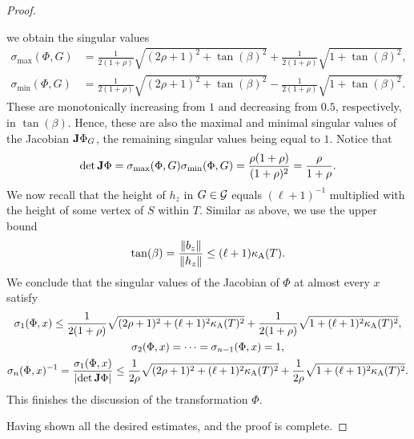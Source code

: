 \documentclass[10pt,a4paper]{article}
\begin{document}
\begin{proof}
\begin{itemize}
        we obtain the singular values 
        \begin{align*}
            \sigma_{\max}(\Phi,G) 
            &
            =
            \frac{1}{2(1+\rho)} \sqrt{ (2\rho + 1)^{2} + \tan(\beta)^2 } + \frac{1}{2(1+\rho)} \sqrt{ 1 + \tan(\beta)^2 } 
            ,
            \\
            \sigma_{\min}(\Phi,G) 
            &
            =
            \frac{1}{2(1+\rho)} \sqrt{ (2\rho + 1)^{2} + \tan(\beta)^2 } - \frac{1}{2(1+\rho)} \sqrt{ 1 + \tan(\beta)^2 } 
            .
        \end{align*}
        These are monotonically increasing from $1$ and decreasing from $0.5$, respectively, in $\tan(\beta)$. 
        Hence, these are also the maximal and minimal singular values of the Jacobian ${\mathbf{J}} \Phi_{G}$, the remaining singular values being equal to $1$. 
        Notice that 
        \begin{align*}
            \det {\mathbf{J}}\Phi = \sigma_{\max}(\Phi,G) \sigma_{\min}(\Phi,G) = \frac{\rho(1+\rho)}{(1+\rho)^2} = \frac{\rho}{1+\rho}.
        \end{align*}
        We now recall that the height of $h_{z}$ in $G \in {\mathcal G}$ equals $(\ell+1)^{-1}$ multiplied with the height of some vertex of $S$ within $T$.
        Similar as above, we use the upper bound 
        \begin{align*}
            \tan(\beta) = \frac{\|  b_{z}  \|}{\|  h_{z}  \|} \leq (\ell+1) \kappa_{\rm A}(T).
        \end{align*}
        We conclude that the singular values of the Jacobian of $\Phi$ at almost every $x$ satisfy 
        \begin{gather}
            \sigma_{1}(\Phi,x) %
            \leq 
            \frac{1}{2(1+\rho)} \sqrt{ (2\rho + 1)^{2} + (\ell+1)^2 \aspectratio(T)^2 } 
            + 
            \frac{1}{2(1+\rho)} \sqrt{               1 + (\ell+1)^2 \aspectratio(T)^2 }
            \label{math:phi_max}
            ,
            \\
            \sigma_{2}(\Phi,x) = \dots = \sigma_{n-1}(\Phi,x) = 1,
            \\
            \sigma_{n}(\Phi,x)^{-1} %
            =
            \frac{ \sigma_{1}(\Phi,x) }{ \left| \det \Jacobian\Phi \right| }
            \leq 
            \frac{1}{2\rho}
            \sqrt{ (2\rho + 1)^{2} + (\ell+1)^2 \aspectratio(T)^2 } 
            + 
            \frac{1}{2\rho}
            \sqrt{               1 + (\ell+1)^2 \aspectratio(T)^2 }
            \label{math:phi_min}
            .
        \end{gather}
        This finishes the discussion of the transformation $\Phi$. 
    \end{itemize}
    Having shown all the desired estimates, and the proof is complete. 
\end{proof}
\end{document}
